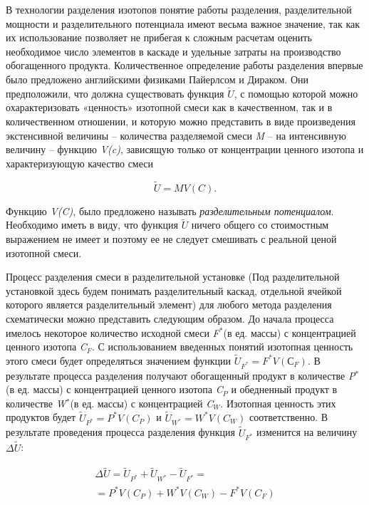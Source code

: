 В технологии разделения изотопов понятие работы разделения, разделительной мощности и разделительного потенциала имеют весьма важное значение, так как их использование позволяет не прибегая к сложным расчетам оценить необходимое число элементов в каскаде и удельные затраты на производство обогащенного продукта. Количественное определение работы разделения впервые было предложено английскими физиками Пайерлсом и Дираком. Они предположили, что должна существовать функция $\tilde{U}$, с помощью которой можно охарактеризовать «ценность» изотопной смеси как в качественном, так и в количественном отношении, и которую можно представить в виде произведения экстенсивной величины -- количества разделяемой смеси \textit{M} -- на интенсивную величину -- функцию \textit{V(c)}, зависящую только от концентрации ценного изотопа и характеризующую качество смеси

\begin{equation} \label{GrindEQ__1_13_} 
\tilde{U}=MV(C).       
\end{equation} 

Функцию \textit{V(C)}, было предложено называть \textit{разделительным потенциалом}. Необходимо иметь в виду, что функция $\tilde{U}$ ничего общего со стоимостным выражением не имеет и поэтому ее не следует смешивать с реальной ценой изотопной смеси.

Процесс разделения смеси в разделительной установке (Под разделительной установкой здесь будем понимать разделительный каскад, отдельной ячейкой которого является разделительный элемент) для любого метода разделения схематически можно представить следующим образом. До начала процесса имелось некоторое количество исходной смеси \textit{F$^{*}$}(в ед. массы) с концентрацией ценного изотопа \textit{C${}_{F}$}. С использованием введенных понятий изотопная ценность этого смеси будет определяться значением функции $\tilde{U}_{F^{*} } =F^{*} V(С_{F} )$. В результате процесса разделения получают обогащенный продукт в количестве \textit{P${}^{*}$}(в ед. массы) с концентрацией ценного изотопа \textit{C${}_{P}$} и обедненный продукт в количестве \textit{W${}^{*}$}(в ед. массы) с концентрацией \textit{C${}_{W}$}. Изотопная ценность этих продуктов будет $\tilde{U}_{P^{*} } =P^{*} V(C_{P} )$ и $\tilde{U}_{W^{*} } =W^{*} V(C_{W} )$ соответственно. В результате проведения процесса разделения функция $\tilde{U}_{F^{*} } $ изменится на величину $\Delta \tilde{U}$:

\begin{equation} \label{GrindEQ__1_14_} 
\begin{array}{l} {\Delta \tilde{U}=\tilde{U}_{P^{*} } +\tilde{U}_{W^{*} } -\tilde{U}_{F^{*} } =} \\ {=P^{*} V(C_{P} )+W^{*} V(C_{W} )-F^{*} V(C_{F} )} \end{array}           
\end{equation} 

